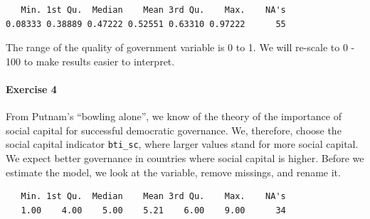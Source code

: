\documentclass[]{article}
\newenvironment{Shaded}{\begin{snugshade}}{\end{snugshade}}
\newcommand{\KeywordTok}[1]{\textcolor[rgb]{0.13,0.29,0.53}{\textbf{#1}}}
\newcommand{\DecValTok}[1]{\textcolor[rgb]{0.00,0.00,0.81}{#1}}
\newcommand{\StringTok}[1]{\textcolor[rgb]{0.31,0.60,0.02}{#1}}
\newcommand{\CommentTok}[1]{\textcolor[rgb]{0.56,0.35,0.01}{\textit{#1}}}
\newcommand{\OperatorTok}[1]{\textcolor[rgb]{0.81,0.36,0.00}{\textbf{#1}}}
\newcommand{\NormalTok}[1]{#1}
\let\oldparagraph\paragraph
\renewcommand{\paragraph}[1]{\oldparagraph{#1}\mbox{}}
\theoremstyle{definition}
\theoremstyle{definition}
\theoremstyle{definition}
\theoremstyle{remark}
\begin{document}
\begin{verbatim}
   Min. 1st Qu.  Median    Mean 3rd Qu.    Max.    NA's 
0.08333 0.38889 0.47222 0.52551 0.63310 0.97222      55 
\end{verbatim}

\begin{Shaded}
\end{Shaded}

The range of the quality of government variable is 0 to 1. We will
re-scale to 0 - 100 to make results easier to interpret.

\begin{Shaded}
\end{Shaded}

\paragraph{Exercise 4}\label{exercise-4-6}

From Putnam's ``bowling alone'', we know of the theory of the importance
of social capital for successful democratic governance. We, therefore,
choose the social capital indicator \texttt{bti\_sc}, where larger
values stand for more social capital. We expect better governance in
countries where social capital is higher. Before we estimate the model,
we look at the variable, remove missings, and rename it.

\begin{Shaded}
\end{Shaded}

\begin{verbatim}
   Min. 1st Qu.  Median    Mean 3rd Qu.    Max.    NA's 
   1.00    4.00    5.00    5.21    6.00    9.00      34 
\end{verbatim}
\end{document}
